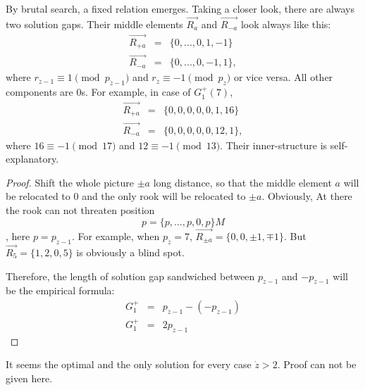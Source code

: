 \documentclass[twocolumn]{article}%
\theoremstyle{definition}
\theoremstyle{remark}
\begin{document}
By brutal search, a fixed relation emerges. Taking a closer look, there are always two solution gaps. Their middle elements $\overrightarrow{R_a}$ and $\overrightarrow{R_{-a}}$ look always like this:
\begin{eqnarray*}
	\overrightarrow{R_{+a}}&=&\{0,...,0,1,-1\}\\
	\overrightarrow{R_{-a}}&=&\{0,...,0,-1,1\},
\end{eqnarray*}
where $r_{\dot{z}-1}\equiv1\pmod{p_{\dot{z}-1}}$ and $r_{\dot{z}}\equiv-1\pmod{p_{\dot{z}}}$ or vice versa. All other components are 0s.
For example, in case of $G_1^{+}(7)$,
\begin{eqnarray*}
	\overrightarrow{R_{+a}}&=&\{0,0,0,0,0,1,16\}\\
	\overrightarrow{R_{-a}}&=&\{0,0,0,0,0,12,1\},
\end{eqnarray*}
where $16\equiv-1 \pmod{17}$ and $12\equiv-1\pmod{13}$. Their inner-structure is self-explanatory.
\begin{proof}
Shift the whole picture $\pm a$ long distance, so that the middle element $a$ will be relocated to 0 and the only rook will be relocated to $\pm a$.
Obviously, At there the rook can not threaten position
\begin{equation*}
p=\{p,\dots,p,0,p\}M
\end{equation*}, here $p = p_{\dot{z}-1}$. For example, when $p_{\dot{z}}=7$, $\overrightarrow{R_{\pm a}}=\{0, 0, \pm1, \mp1\}$. But  $\overrightarrow{R_5}=\{1, 2, 0, 5\}$ is obviously a blind spot.

Therefore, the length of solution gap sandwiched between $p_{\dot{z}-1}$ and $-p_{\dot{z}-1}$ will be the empirical formula:
\begin{eqnarray*}
	G_1^{+} &=& p_{\dot{z}-1}-(-p_{\dot{z}-1})\\
	G_1^{+} &=& 2p_{\dot{z}-1}
\end{eqnarray*}
\end{proof}
It seems the optimal and the only solution for every case  $\dot{z}>2$. Proof can not be given here.
\end{document}
